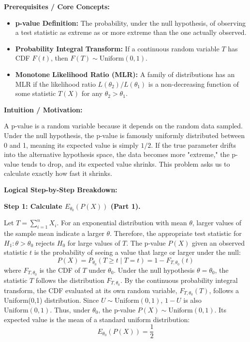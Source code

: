 \begin{solution}
\textbf{Prerequisites / Core Concepts:}
\begin{itemize}
    \item \textbf{p-value Definition:} The probability, under the null hypothesis, of observing a test statistic as extreme as or more extreme than the one actually observed.
    \item \textbf{Probability Integral Transform:} If a continuous random variable $T$ has CDF $F(t)$, then $F(T) \sim \text{Uniform}(0,1)$.
    \item \textbf{Monotone Likelihood Ratio (MLR):} A family of distributions has an MLR if the likelihood ratio $L(\theta_2)/L(\theta_1)$ is a non-decreasing function of some statistic $T(X)$ for any $\theta_2 > \theta_1$.
\end{itemize}

\textbf{Intuition / Motivation:}

A p-value is a random variable because it depends on the random data sampled. Under the null hypothesis, the p-value is famously uniformly distributed between 0 and 1, meaning its expected value is simply $1/2$. If the true parameter drifts into the alternative hypothesis space, the data becomes more "extreme," the p-value tends to drop, and its expected value shrinks. This problem asks us to calculate exactly how fast it shrinks.

\textbf{Logical Step-by-Step Breakdown:}

\textbf{Step 1: Calculate $E_{\theta_0}(P(X))$ (Part 1).}

Let $T = \sum_{i=1}^n X_i$. For an exponential distribution with mean $\theta$, larger values of the sample mean indicate a larger $\theta$. Therefore, the appropriate test statistic for $H_1: \theta > \theta_0$ rejects $H_0$ for large values of $T$.
The p-value $P(X)$ given an observed statistic $t$ is the probability of seeing a value that large or larger under the null:
\[ P(X) = P_{\theta_0}(T \geq t \mid T=t) = 1 - F_{T, \theta_0}(t) \]
where $F_{T, \theta_0}$ is the CDF of $T$ under $\theta_0$.
Under the null hypothesis $\theta = \theta_0$, the statistic $T$ follows the distribution $F_{T, \theta_0}$. By the continuous probability integral transform, the CDF evaluated at its own random variable, $F_{T, \theta_0}(T)$, follows a Uniform(0,1) distribution.
Since $U \sim \text{Uniform}(0,1)$, $1-U$ is also $\text{Uniform}(0,1)$.
Thus, under $\theta_0$, the p-value $P(X) \sim \text{Uniform}(0,1)$.
Its expected value is the mean of a standard uniform distribution:
\[ E_{\theta_0}(P(X)) = \frac{1}{2} \]


\end{solution}
